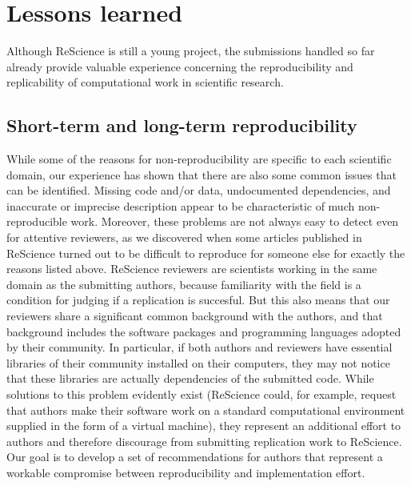 \documentclass[a4paper,10pt, twocolumn]{article}
\begin{document}
\section*{Lessons learned}

Although ReScience is still a young project, the submissions handled
so far already provide valuable experience concerning the
reproducibility and replicability of computational work in scientific
research.

\subsection*{Short-term and long-term reproducibility}

While some of the reasons for non-reproducibility are specific to each
scientific domain, our experience has shown that there are also some
common issues that can be identified.  Missing code and/or data,
undocumented dependencies, and inaccurate or imprecise description
appear to be characteristic of much non-reproducible work. Moreover,
these problems are not always easy to detect even for attentive
reviewers, as we discovered when some articles published in ReScience
turned out to be difficult to reproduce for someone else for exactly
the reasons listed above. ReScience reviewers are scientists working
in the same domain as the submitting authors, because familiarity with
the field is a condition for judging if a replication is
succesful. But this also means that our reviewers share a significant
common background with the authors, and that background includes the
software packages and programming languages adopted by their
community.  In particular, if both authors and reviewers have
essential libraries of their community installed on their computers,
they may not notice that these libraries are actually dependencies of
the submitted code.  While solutions to this problem evidently exist
(ReScience could, for example, request that authors make their
software work on a standard computational environment supplied in the
form of a virtual machine), they represent an additional effort to
authors and therefore discourage from submitting replication work to
ReScience.  Our goal is to develop a set of recommendations for
authors that represent a workable compromise between reproducibility
and implementation effort.\\
\end{document}
